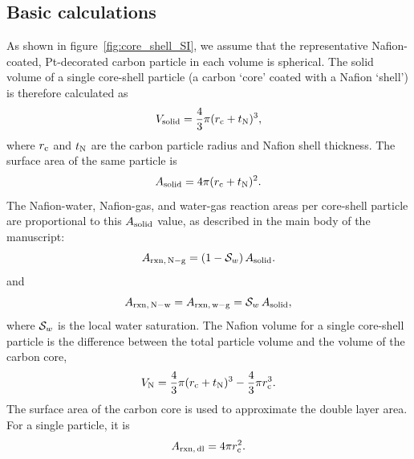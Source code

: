 \documentclass[final,3p,times,onecolumn]{elsarticle}    %
\begin{document}
\subsection{Basic calculations}
As shown in figure~\ref{fig:core_shell_SI}, we assume that the representative Nafion-coated, Pt-decorated carbon particle in each volume is spherical. The solid volume of a single core-shell particle (a carbon `core' coated with a Nafion `shell') is therefore calculated as
\begin{equation}\label{eq:V_solid}
    V_{\rm solid} = \frac{4}{3} \pi (r_{\rm c} + t_{\rm N})^3,
\end{equation}
where $r_{\rm c}$ and $t_{\rm N}$ are the carbon particle radius and Nafion shell thickness. The surface area of the same particle is
\begin{equation}
    A_{\rm solid} = 4 \pi (r_{\rm c} + t_{\rm N})^2. 
\end{equation}
The Nafion-water, Nafion-gas, and water-gas reaction areas per core-shell particle are proportional to this $A_{\rm solid}$ value, as described in the main body of the manuscript:
\begin{equation}
    A_{\rm rxn,\,N-g} = (1-{\cal S}_w)\,A_{\rm solid}.
\end{equation}
and
\begin{equation}
    A_{\rm rxn,\,N-w} =A_{\rm rxn,\,w-g} =  {\cal S}_w\,A_{\rm solid},
\end{equation}
where ${\cal S}_w$ is the local water saturation. The Nafion volume for a single core-shell particle is the difference between the total particle volume and the volume of the carbon core,
\begin{equation}
    V_{\rm N} = \frac{4}{3} \pi (r_{\rm c} + t_{\rm N})^3 - \frac{4}{3} \pi r_{\rm c}^3.
\end{equation}
The surface area of the carbon core is used to approximate the double layer area. For a single particle, it is
\begin{equation}
    A_{\rm rxn,\,dl} = 4 \pi r_{\rm c}^2.
\end{equation}
\end{document}
